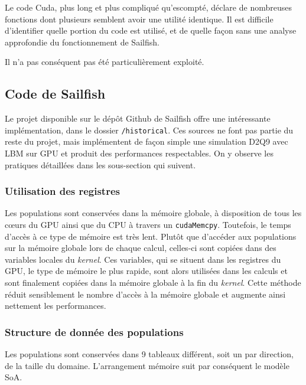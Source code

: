 Le code Cuda, plus long et plus compliqué qu'escompté, déclare de nombreuses fonctions dont plusieurs semblent avoir une utilité identique. Il est difficile d'identifier quelle portion du code est utilisé, et de quelle façon sans une analyse approfondie du fonctionnement de Sailfish.

Il n'a pas conséquent pas été particulièrement exploité.

\subsection{Code  de Sailfish}
Le projet disponible sur le dépôt Github de Sailfish offre une intéressante implémentation, dans le dossier \texttt{/historical}. Ces sources ne font pas partie du reste du projet, mais implémentent de façon simple une simulation D2Q9 avec \acs{LBM} sur \acs{GPU} et produit des performances respectables. On y observe les pratiques détaillées dans les sous-section qui suivent.

\subsubsection{Utilisation des registres}
Les populations sont conservées dans la mémoire globale, à disposition de tous les cœurs du \acs{GPU} ainsi que du \acs{CPU} à travers un \texttt{cudaMemcpy}. Toutefois, le temps d'accès à ce type de mémoire est très lent. Plutôt que d'accéder aux populations sur la mémoire globale lors de chaque calcul, celles-ci sont copiées dans des variables locales du \textit{kernel}. Ces variables, qui se situent dans les registres du \acs{GPU}, le type de mémoire le plus rapide, sont alors utilisées dans les calculs et sont finalement copiées dans la mémoire globale à la fin du \textit{kernel}.
Cette méthode réduit sensiblement le nombre d'accès à la mémoire globale et augmente ainsi nettement les performances.
\subsubsection{Structure de donnée des populations}
Les populations sont conservées dans 9 tableaux différent, soit un par direction, de la taille du domaine. L'arrangement mémoire suit par conséquent le modèle \acs{SoA}.

